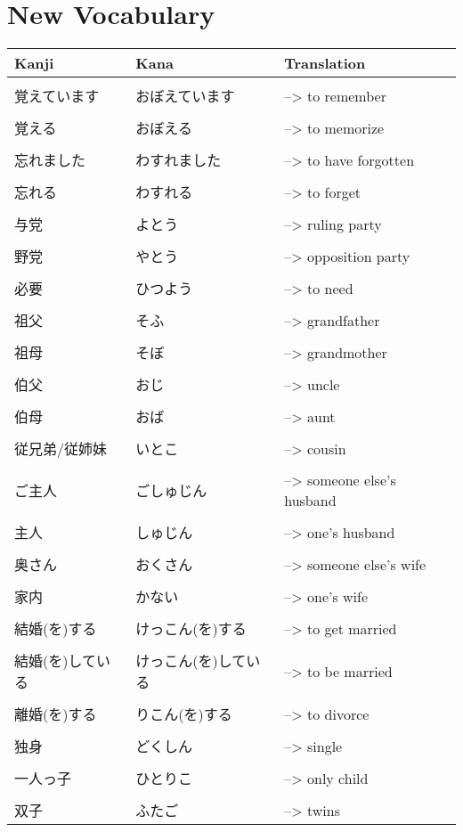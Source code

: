 \documentclass{article}
\begin{document}
\part*{New Vocabulary}
\begin{tabular}{ l | l l }
Kanji&Kana&Translation\\ \hline\\[-1em]
覚えています&おぼえています&--> to remember \\ \hline\\[-1em]
覚える &おぼえる&--> to memorize \\ \hline\\[-1em]
忘れました &わすれました&--> to have forgotten \\ \hline\\[-1em]
忘れる &わすれる&--> to forget \\ \hline\\[-1em]
与党 &よとう&--> ruling party \\ \hline\\[-1em]
野党 &やとう&--> opposition party \\ \hline\\[-1em]
必要&ひつよう&--> to need \\ \hline\\[-1em]
祖父&そふ&--> grandfather \\ \hline\\[-1em]
祖母&そぼ&--> grandmother \\ \hline\\[-1em]
伯父&おじ&--> uncle \\ \hline\\[-1em]
伯母&おば&--> aunt \\ \hline\\[-1em]
従兄弟/従姉妹&いとこ&--> cousin \\ \hline\\[-1em]
ご主人&ごしゅじん&--> someone else's husband \\ \hline\\[-1em]
主人&しゅじん&--> one's husband \\ \hline\\[-1em]
奥さん&おくさん&--> someone else's wife \\ \hline\\[-1em]
家内&かない&--> one's wife \\ \hline\\[-1em]
結婚(を)する&けっこん(を)する&--> to get married \\ \hline\\[-1em]
結婚(を)している&けっこん(を)している&--> to be married \\ \hline\\[-1em]
離婚(を)する&りこん(を)する&--> to divorce \\ \hline\\[-1em]
独身&どくしん&--> single \\ \hline\\[-1em] 
一人っ子&ひとりこ&--> only child \\ \hline\\[-1em]
双子&ふたご&--> twins %
\end{tabular}
\end{document}
